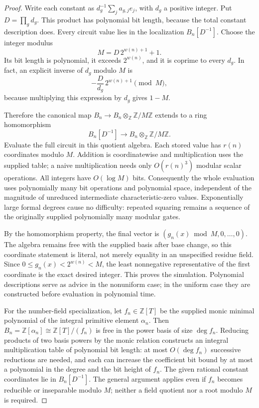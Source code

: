 \begin{proof}
Write each constant as $d_g^{-1}\sum_j a_{g,j}e_j$, with $d_g$ a positive integer. Put $D=\prod_g d_g$. This product has polynomial bit length, because the total constant description does. Every circuit value lies in the localization $B_n[D^{-1}]$. Choose the integer modulus
\[
 M=D\,2^{w(n)+1}+1.
\]
Its bit length is polynomial, it exceeds $2^{w(n)}$, and it is coprime to every $d_g$. In fact, an explicit inverse of $d_g$ modulo $M$ is
\[
 -\frac{D}{d_g}\,2^{w(n)+1}\pmod M,
\]
because multiplying this expression by $d_g$ gives $1-M$.

Therefore the canonical map $B_n\to B_n\otimes_{\mathbb Z}\mathbb Z/M\mathbb Z$ extends to a ring homomorphism
\[
 B_n[D^{-1}]\longrightarrow
 B_n\otimes_{\mathbb Z}\mathbb Z/M\mathbb Z.
\]
Evaluate the full circuit in this quotient algebra. Each stored value has $r(n)$ coordinates modulo $M$. Addition is coordinatewise and multiplication uses the supplied table; a naive multiplication needs only $O(r(n)^3)$ modular scalar operations. All integers have $O(\log M)$ bits. Consequently the whole evaluation uses polynomially many bit operations and polynomial space, independent of the magnitude of unreduced intermediate characteristic-zero values. Exponentially large formal degrees cause no difficulty: repeated squaring remains a sequence of the originally supplied polynomially many modular gates.

By the homomorphism property, the final vector is $(g_n(x)\bmod M,0,\ldots,0)$. The algebra remains free with the supplied basis after base change, so this coordinate statement is literal, not merely equality in an unspecified residue field. Since $0\leq g_n(x)<2^{w(n)}<M$, the least nonnegative representative of the first coordinate is the exact desired integer. This proves the simulation. Polynomial descriptions serve as advice in the nonuniform case; in the uniform case they are constructed before evaluation in polynomial time.

For the number-field specialization, let $f_n\in\mathbb Z[T]$ be the supplied monic minimal polynomial of the integral primitive element $\alpha_n$. Then $B_n=\mathbb Z[\alpha_n]\cong\mathbb Z[T]/(f_n)$ is free in the power basis of size $\deg f_n$. Reducing products of two basis powers by the monic relation constructs an integral multiplication table of polynomial bit length: at most $O(\deg f_n)$ successive reductions are needed, and each can increase the coefficient bit bound by at most a polynomial in the degree and the bit height of $f_n$. The given rational constant coordinates lie in $B_n[D^{-1}]$. The general argument applies even if $f_n$ becomes reducible or inseparable modulo $M$; neither a field quotient nor a root modulo $M$ is required.


\end{proof}
